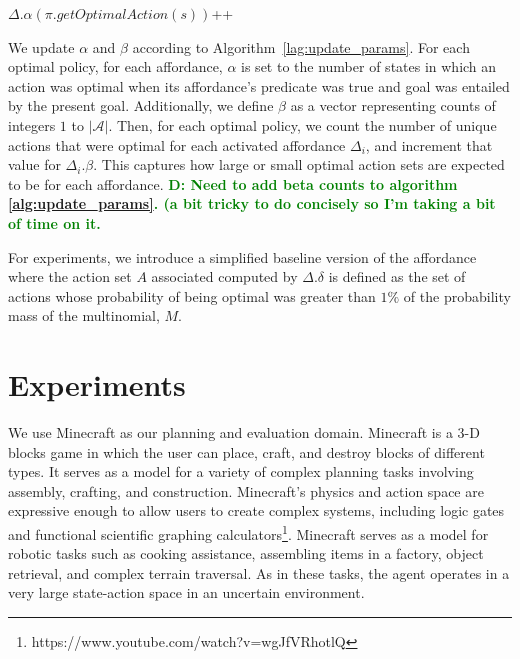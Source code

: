 \documentclass[conference]{IEEEtran}
\newcommand{\dnote}[1]{\textcolor{Green}{\textbf{D: #1}}}
\begin{document}
\begin{algorithm}
  \caption{$updateParameters(knowledgeBase, \pi)$}
  \begin{algorithmic}[1]
    \State $\Delta.\alpha(\pi.getOptimalAction(s))$++
    \EndIf
    \EndFor
    \EndFor
  \end{algorithmic}
  \label{alg:update_params}
\end{algorithm}

We update $\alpha$ and $\beta$ according to Algorithm~\ref{lag:update_params}.
For each optimal policy, for each affordance, $\alpha$ is set to the number of states in which an action was optimal
when its affordance's predicate was true and goal was entailed by the present goal.
Additionally, we define $\beta$ as a vector representing counts of
integers $1$ to $|\mathcal{A}|$. Then, for each optimal policy, we
count the number of unique actions that were optimal for each
activated affordance $\Delta_i$, and increment that value for
$\Delta_i.\beta$. This captures how large or small optimal action sets
are expected to be for each affordance. \dnote{Need to add beta 
counts to algorithm \ref{alg:update_params}. (a bit tricky to do concisely so I'm taking a bit of time on it.}

For experiments, we introduce a simplified baseline version of the affordance where
the action set $A$ associated computed by $\Delta.\delta$ is defined
as the set of actions whose probability of being optimal was greater than $1\%$
of the probability mass of the multinomial, $M$.

\section{Experiments}
\label{sec:experiments}

We use Minecraft as our planning and evaluation domain. Minecraft is a
 3-D blocks game in which the user can place, craft, and destroy blocks
 of different types. It serves as a model for a variety of complex planning tasks involving 
 assembly, crafting, and construction.  Minecraft's physics and action space are expressive
 enough to allow users to create complex systems, including logic gates and 
 functional scientific graphing calculators\footnote{https://www.youtube.com/watch?v=wgJfVRhotlQ}.
 Minecraft serves as a model for robotic tasks such as cooking assistance, assembling items in a factory, 
 object retrieval, and complex terrain traversal.  As in these tasks, the agent operates in a very large state-action space in an uncertain environment.
\end{document}
